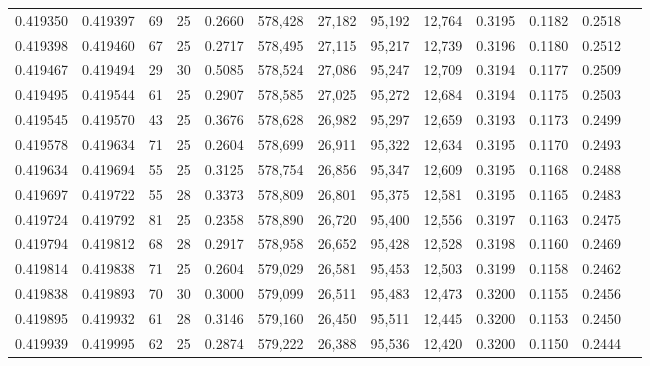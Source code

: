 \begin{tabular}{rrrrrrrrrrrrr}
0.419350 & 0.419397 &    69 &  25 &                                     0.2660 & 578,428 &  27,182 &  95,192 &  12,764 & 0.3195 & 0.1182 & 0.2518 \\
0.419398 & 0.419460 &    67 &  25 &                                     0.2717 & 578,495 &  27,115 &  95,217 &  12,739 & 0.3196 & 0.1180 & 0.2512 \\
0.419467 & 0.419494 &    29 &  30 &                                     0.5085 & 578,524 &  27,086 &  95,247 &  12,709 & 0.3194 & 0.1177 & 0.2509 \\
0.419495 & 0.419544 &    61 &  25 &                                     0.2907 & 578,585 &  27,025 &  95,272 &  12,684 & 0.3194 & 0.1175 & 0.2503 \\
0.419545 & 0.419570 &    43 &  25 &                                     0.3676 & 578,628 &  26,982 &  95,297 &  12,659 & 0.3193 & 0.1173 & 0.2499 \\
0.419578 & 0.419634 &    71 &  25 &                                     0.2604 & 578,699 &  26,911 &  95,322 &  12,634 & 0.3195 & 0.1170 & 0.2493 \\
0.419634 & 0.419694 &    55 &  25 &                                     0.3125 & 578,754 &  26,856 &  95,347 &  12,609 & 0.3195 & 0.1168 & 0.2488 \\
0.419697 & 0.419722 &    55 &  28 &                                     0.3373 & 578,809 &  26,801 &  95,375 &  12,581 & 0.3195 & 0.1165 & 0.2483 \\
0.419724 & 0.419792 &    81 &  25 &                                     0.2358 & 578,890 &  26,720 &  95,400 &  12,556 & 0.3197 & 0.1163 & 0.2475 \\
0.419794 & 0.419812 &    68 &  28 &                                     0.2917 & 578,958 &  26,652 &  95,428 &  12,528 & 0.3198 & 0.1160 & 0.2469 \\
0.419814 & 0.419838 &    71 &  25 &                                     0.2604 & 579,029 &  26,581 &  95,453 &  12,503 & 0.3199 & 0.1158 & 0.2462 \\
0.419838 & 0.419893 &    70 &  30 &                                     0.3000 & 579,099 &  26,511 &  95,483 &  12,473 & 0.3200 & 0.1155 & 0.2456 \\
0.419895 & 0.419932 &    61 &  28 &                                     0.3146 & 579,160 &  26,450 &  95,511 &  12,445 & 0.3200 & 0.1153 & 0.2450 \\
0.419939 & 0.419995 &    62 &  25 &                                     0.2874 & 579,222 &  26,388 &  95,536 &  12,420 & 0.3200 & 0.1150 & 0.2444 \\

\end{tabular}
